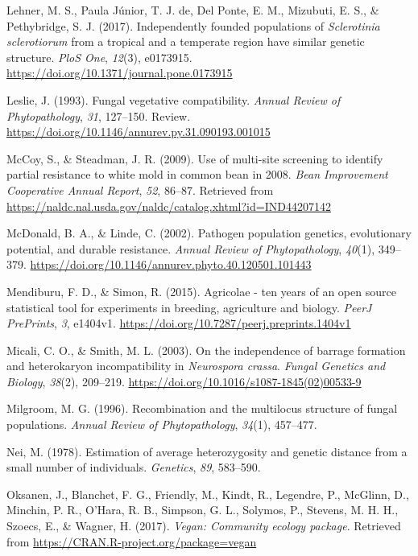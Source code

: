 \documentclass[fleqn,10pt,lineno]{wlpeerj} %
\theoremstyle{definition}
\theoremstyle{definition}
\theoremstyle{definition}
\theoremstyle{remark}
\begin{document}
\hypertarget{ref-lehner2017independently}{}
Lehner, M. S., Paula Júnior, T. J. de, Del Ponte, E. M., Mizubuti, E.
S., \& Pethybridge, S. J. (2017). Independently founded populations of
\emph{Sclerotinia sclerotiorum} from a tropical and a temperate region
have similar genetic structure. \emph{PloS One}, \emph{12}(3), e0173915.
\url{https://doi.org/10.1371/journal.pone.0173915}

\hypertarget{ref-leslie1993fungal}{}
Leslie, J. (1993). Fungal vegetative compatibility. \emph{Annual Review
of Phytopathology}, \emph{31}, 127--150. Review.
\url{https://doi.org/10.1146/annurev.py.31.090193.001015}

\hypertarget{ref-mccoy2009use}{}
McCoy, S., \& Steadman, J. R. (2009). Use of multi-site screening to
identify partial resistance to white mold in common bean in 2008.
\emph{Bean Improvement Cooperative Annual Report}, \emph{52}, 86--87.
Retrieved from
\url{https://naldc.nal.usda.gov/naldc/catalog.xhtml?id=IND44207142}

\hypertarget{ref-mcdonald2002pathogen}{}
McDonald, B. A., \& Linde, C. (2002). Pathogen population genetics,
evolutionary potential, and durable resistance. \emph{Annual Review of
Phytopathology}, \emph{40}(1), 349--379.
\url{https://doi.org/10.1146/annurev.phyto.40.120501.101443}

\hypertarget{ref-mendiburu2015agricolae}{}
Mendiburu, F. D., \& Simon, R. (2015). Agricolae - ten years of an open
source statistical tool for experiments in breeding, agriculture and
biology. \emph{PeerJ PrePrints}, \emph{3}, e1404v1.
\url{https://doi.org/10.7287/peerj.preprints.1404v1}

\hypertarget{ref-micali2003independence}{}
Micali, C. O., \& Smith, M. L. (2003). On the independence of barrage
formation and heterokaryon incompatibility in \emph{Neurospora crassa}.
\emph{Fungal Genetics and Biology}, \emph{38}(2), 209--219.
\url{https://doi.org/10.1016/s1087-1845(02)00533-9}

\hypertarget{ref-milgroom1996recombination}{}
Milgroom, M. G. (1996). Recombination and the multilocus structure of
fungal populations. \emph{Annual Review of Phytopathology},
\emph{34}(1), 457--477.

\hypertarget{ref-nei1978estimation}{}
Nei, M. (1978). Estimation of average heterozygosity and genetic
distance from a small number of individuals. \emph{Genetics}, \emph{89},
583--590.

\hypertarget{ref-vegan}{}
Oksanen, J., Blanchet, F. G., Friendly, M., Kindt, R., Legendre, P.,
McGlinn, D., Minchin, P. R., O'Hara, R. B., Simpson, G. L., Solymos, P.,
Stevens, M. H. H., Szoecs, E., \& Wagner, H. (2017). \emph{Vegan:
Community ecology package}. Retrieved from
\url{https://CRAN.R-project.org/package=vegan}
\end{document}
